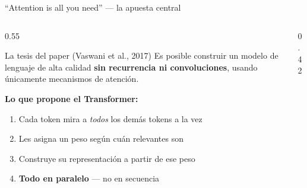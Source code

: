 \documentclass[aspectratio=169, 10pt]{beamer}
\newcommand{\highlight}[1]{\textcolor{fenred}{\textbf{#1}}}
\newcommand{\concept}[1]{\textcolor{fenblue}{\textbf{#1}}}
\begin{document}
\begin{frame}{``Attention is all you need'' --- la apuesta central}

  \begin{columns}[T]
    \begin{column}{0.55\textwidth}
      \begin{block}{La tesis del paper (Vaswani et al., 2017)}
        Es posible construir un modelo de lenguaje de alta calidad \highlight{sin recurrencia ni convoluciones}, usando únicamente mecanismos de atención.
      \end{block}

      \vspace{0.5em}
      \textbf{Lo que propone el Transformer:}
      \begin{enumerate}
        \item Cada token mira a \textit{todos} los demás tokens a la vez
        \item Les asigna un peso según cuán relevantes son
        \item Construye su representación a partir de ese peso
        \item \concept{Todo en paralelo} --- no en secuencia
      \end{enumerate}
    \end{column}
    \begin{column}{0.42\textwidth}
    \end{column}
  \end{columns}

\end{frame}
\end{document}
